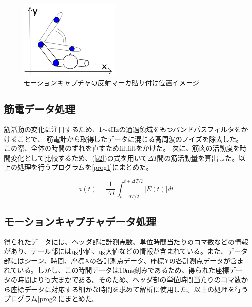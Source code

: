 \documentclass{jsarticle}
\begin{document}
\begin{figure}[htb]
  \begin{center}
    \includegraphics[width=5cm]{karada.png}
    \caption{モーションキャプチャの反射マーカ貼り付け位置イメージ}
    \label{karada2}
  \end{center}
\end{figure}


\subsection{筋電データ処理}
筋活動の変化に注目するため、1$\sim$4Hzの通過領域をもつバンドパスフィルタをかけることで、
筋電計から取得したデータに混じる高周波のノイズを除去した。
この際、全体の時間のずれを直すためfiltfiltをかけた。
次に、筋肉の活動度を時間変化として比較するため、(\ref{s2})の式を用いて$\Delta T$間の筋活動量を算出した。以上の処理を行うプログラムを\ref{prog1}にまとめた。



\begin{equation}
  a(t)=\frac{1}{\Delta T}\int_{t-\Delta T/2}^{t+\Delta T/2}|E(t)|dt 
  \label{s2}
\end{equation}


\subsection{モーションキャプチャデータ処理}
得られたデータには、ヘッダ部に計測点数、単位時間当たりのコマ数などの情報があり、テール部には最小値、最大値などの情報が含まれている。また、データ部にはシーン、時間、座標Xの各計測点データ、座標Yの各計測点データが含まれている。しかし、この時間データは10ms刻みであるため、得られた座標データの時間よりも大まかである。そのため、ヘッダ部の単位時間当たりのコマ数から座標データに対応する細かな時間を求めて解析に使用した。以上の処理を行うプログラム\ref{prog2}にまとめた。
\end{document}
